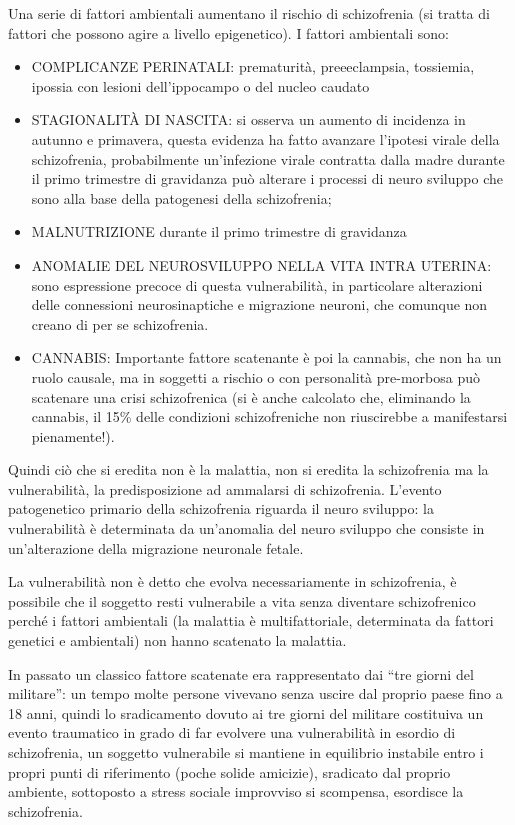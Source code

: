 Una serie di fattori ambientali aumentano il rischio di schizofrenia (si
tratta di fattori che possono agire a livello epigenetico). I fattori
ambientali sono:

\begin{itemize}
\item
  COMPLICANZE PERINATALI: prematurità, preeeclampsia, tossiemia, ipossia
  con lesioni dell'ippocampo o del nucleo caudato
\item
  STAGIONALITÀ DI NASCITA: si osserva un aumento di incidenza in autunno
  e primavera, questa evidenza ha fatto avanzare l'ipotesi virale della
  schizofrenia, probabilmente un'infezione virale contratta dalla madre
  durante il primo trimestre di gravidanza può alterare i processi di
  neuro sviluppo che sono alla base della patogenesi della schizofrenia;
\item
  MALNUTRIZIONE durante il primo trimestre di gravidanza
\item
  ANOMALIE DEL NEUROSVILUPPO NELLA VITA INTRA UTERINA: sono espressione
  precoce di questa vulnerabilità, in particolare alterazioni delle
  connessioni neurosinaptiche e migrazione neuroni, che comunque non
  creano di per se schizofrenia.
\item
  CANNABIS: Importante fattore scatenante è poi la cannabis, che non ha
  un ruolo causale, ma in soggetti a rischio o con personalità
  pre-morbosa può scatenare una crisi schizofrenica (si è anche
  calcolato che, eliminando la cannabis, il 15\% delle condizioni
  schizofreniche non riuscirebbe a manifestarsi pienamente!).
\end{itemize}

Quindi ciò che si eredita non è la malattia, non si eredita la
schizofrenia ma la vulnerabilità, la predisposizione ad ammalarsi di
schizofrenia. L'evento patogenetico primario della schizofrenia riguarda
il neuro sviluppo: la vulnerabilità è determinata da un'anomalia del
neuro sviluppo che consiste in un'alterazione della migrazione neuronale
fetale.

La vulnerabilità non è detto che evolva necessariamente in schizofrenia,
è possibile che il soggetto resti vulnerabile a vita senza diventare
schizofrenico perché i fattori ambientali (la malattia è
multifattoriale, determinata da fattori genetici e ambientali) non hanno
scatenato la malattia.

In passato un classico fattore scatenate era rappresentato dai ``tre
giorni del militare'': un tempo molte persone vivevano senza uscire dal
proprio paese fino a 18 anni, quindi lo sradicamento dovuto ai tre
giorni del militare costituiva un evento traumatico in grado di far
evolvere una vulnerabilità in esordio di schizofrenia, un soggetto
vulnerabile si mantiene in equilibrio instabile entro i propri punti di
riferimento (poche solide amicizie), sradicato dal proprio ambiente,
sottoposto a stress sociale improvviso si scompensa, esordisce la
schizofrenia.

